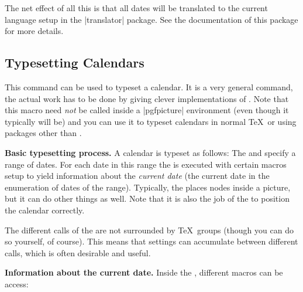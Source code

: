 The net effect of all this is that all dates will be translated to the
current language setup in the |translator| package. See the
documentation of this package for more details.



\subsection{Typesetting Calendars}

\begin{command}{\pgfcalendar{}}
  This command can be used to typeset a calendar. It is a very general
  command, the actual work has to be done by giving clever
  implementations of . Note that this macro need
  \emph{not} be called inside a |{pgfpicture}| environment (even
  though it typically will be) and you can use it to typeset calendars
  in normal \TeX\ or using packages other than \pgfname.

  \medskip
  \textbf{Basic typesetting process.}
  A calendar is typeset as follows: The  and
   specify a range of dates. For each date in this
  range the  is executed with certain macros
  setup to yield information about the \emph{current date}
  (the current date in the enumeration of dates of the
  range). Typically, the  places nodes inside a
  picture, but it can do other things as well. Note that it is also
  the job of the  to position the calendar
  correctly.

  The different calls of the  are not
  surrounded by \TeX\ groups (though you can do so yourself, of
  course). This means that settings can accumulate between different
  calls, which is often desirable and useful.

  \medskip
  \textbf{Information about the current date.}
  Inside the , different macros can be access:


\end{command}
